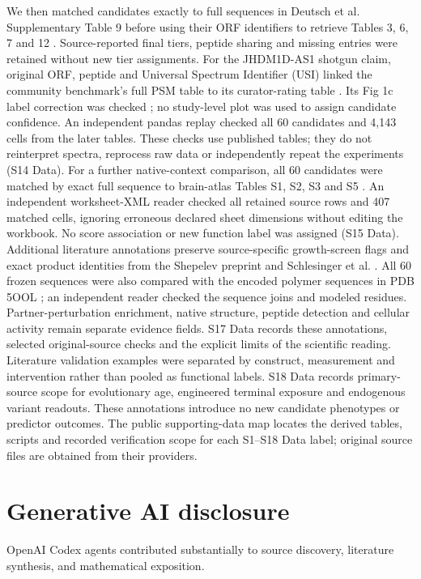 \documentclass[11pt,a4paper]{article}
\begin{document}
We then matched candidates exactly to full sequences in Deutsch et al.
Supplementary Table 9 before using their ORF identifiers to retrieve
Tables 3, 6, 7 and 12 \cite{deutsch}. Source-reported final tiers, peptide
sharing and missing entries were retained without new tier assignments.
For the JHDM1D-AS1 shotgun claim, original ORF, peptide and Universal
Spectrum Identifier (USI) linked the community benchmark's full PSM table
to its curator-rating table \cite{wacholder}. Its Fig 1c label correction
was checked \cite{wacholdercorrection}; no study-level plot was used to
assign candidate confidence. An independent pandas replay checked all
60 candidates and 4,143 cells from the later tables. These checks use published tables; they do not reinterpret spectra, reprocess raw data or independently repeat the experiments (S14 Data).
For a further native-context comparison, all 60 candidates were matched by
exact full sequence to brain-atlas Tables S1, S2, S3 and S5 \cite{brain}.
An independent worksheet-XML reader checked all retained source rows and
407 matched cells, ignoring erroneous declared sheet dimensions without
editing the workbook. No score association or new function label was assigned
(S15 Data).
Additional literature annotations preserve source-specific growth-screen
flags and exact product identities from the Shepelev preprint and
Schlesinger et al. \cite{shepelev,schlesinger}. All 60 frozen sequences were
also compared with the encoded polymer sequences in PDB 5OOL
\cite{brownmitoribosome}; an independent reader checked the sequence joins
and modeled residues. Partner-perturbation enrichment, native structure,
peptide detection and cellular activity remain separate evidence fields.
S17 Data records these annotations, selected original-source checks and
the explicit limits of the scientific reading.
Literature validation examples were separated by construct, measurement
and intervention rather than pooled as functional labels. S18 Data records
primary-source scope for evolutionary age, engineered terminal exposure
and endogenous variant readouts. These annotations introduce no new
candidate phenotypes or predictor outcomes. The public supporting-data map
locates the derived tables, scripts and recorded verification scope for each
S1--S18 Data label; original source files are obtained from their providers.


\section*{Generative AI disclosure}
OpenAI Codex agents contributed substantially to source discovery, literature synthesis, and mathematical exposition.
\end{document}
